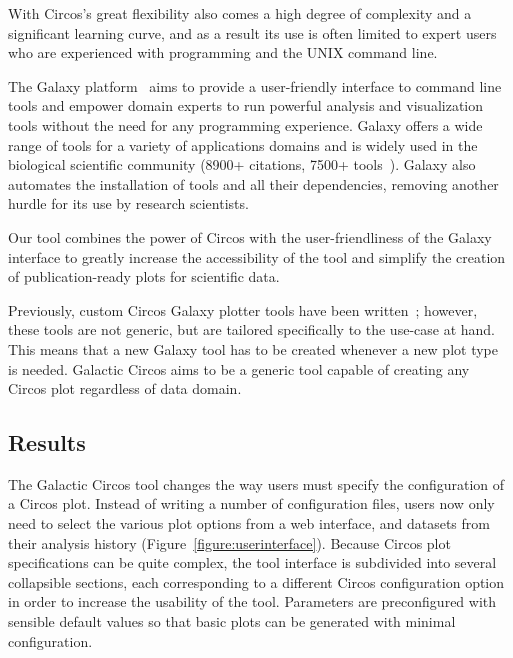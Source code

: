 With Circos's great flexibility also comes a high degree of complexity and a significant learning curve, and as a result its use is often limited to expert users who are experienced with programming and the UNIX command line.

The Galaxy platform~\cite{afgan2018galaxy} aims to provide a user-friendly interface to command line tools and empower domain experts to run powerful analysis and visualization tools without the need for any programming experience. Galaxy offers a wide range of tools for a variety of applications domains and is widely used in the biological scientific community (8900+ citations, 7500+ tools~\cite{galaxycitations,galaxytoolshed}). Galaxy also automates the installation of tools and all their dependencies, removing another hurdle for its use by research scientists.

Our tool combines the power of Circos with the user-friendliness of the Galaxy interface to greatly increase the accessibility of the tool and simplify the creation of publication-ready plots for scientific data.

Previously, custom Circos Galaxy plotter tools have been written~\cite{hiltemann2014cgtag}; however, these tools are not generic, but are tailored specifically to the use-case at hand. This means that a new Galaxy tool has to be created whenever a new plot type is needed. Galactic Circos aims to be a generic tool capable of creating any Circos plot regardless of data domain.

\subsection*{Results}
The Galactic Circos tool changes the way users must specify the configuration of a Circos plot. Instead of writing a number of configuration files, users now only need to select the various plot options from a web interface, and datasets from their analysis history (Figure~\ref{figure:userinterface}). Because Circos plot specifications can be quite complex, the tool interface is subdivided into several collapsible sections, each corresponding to a different Circos configuration option in order to increase the usability of the tool. Parameters are preconfigured with sensible default values so that basic plots can be generated with minimal configuration.

